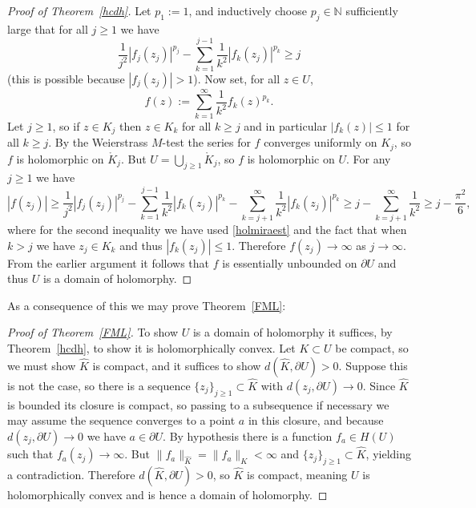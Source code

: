\documentclass[11pt,a4paper, final, twoside]{article}
\numberwithin{equation}{section}
\newcommand{\N}{\mathbb N}
\newcommand{\bd}{\partial}
\newcommand{\inter}[1]{\mathring{#1}}
\newcommand{\emetric}{d}
\newcommand{\hol}{H}
\begin{document}
\begin{proof}[Proof of Theorem~\ref{hcdh}]
Let $p_1:=1$, and inductively choose $p_j\in\N$ sufficiently large that for all $j\geq 1$ we have
\begin{equation} \frac{1}{j^2}|f_j(z_j)|^{p_j}- \sum_{k=1}^{j-1} \frac{1}{k^2}|f_k(z_j)|^{p_k}\geq j \label{holmiraest}\end{equation}
(this is possible because $|f_j(z_j)|>1$). Now set, for all $z\in U$, 
$$ f(z):=\sum_{k=1}^\infty \frac{1}{k^2}f_k(z)^{p_k}. $$
Let $j\geq 1$, so if $z\in K_j$ then $z\in K_k$ for all $k\geq j$ and in particular $|f_k(z)|\leq 1$ for all $k\geq j$. By the Weierstrass $M$-test the series for $f$ 
converges uniformly on $K_j$,
so $f$ is holomorphic on $\inter K_j$. But $U=\bigcup_{j\geq 1}\inter K_j$, so $f$ is holomorphic on $U$.
For any $j\geq 1$ we have
$$ |f(z_j)| \geq \frac{1}{j^2}|f_j(z_j)|^{p_j}-\sum_{k=1}^{j-1} \frac{1}{k^2}|f_k(z_j)|^{p_k} -\sum_{k=j+1}^\infty \frac{1}{k^2}|f_k(z_j)|^{p_k}\geq j-\sum_{k=j+1}^\infty \frac{1}{k^2}\geq j-\frac{\pi^2}{6},$$
where for the second inequality we have used \eqref{holmiraest} and the fact that when $k>j$ we have $z_j\in K_k$ and thus $|f_k(z_j)|\leq 1$. Therefore $f(z_j)\to\infty$ as $j\to\infty$. From the earlier argument it follows that $f$ is essentially unbounded on $\bd U$ and thus $U$ is a domain of holomorphy.
\end{proof}
As a consequence of this we may prove Theorem~\ref{FML}:
\begin{proof}[Proof of Theorem~\ref{FML}]
To show $U$ is a domain of holomorphy it suffices, by Theorem~\ref{hcdh}, to show it is holomorphically convex. Let $K\subset U$ be compact, so we must show $\hat K$ is compact, and it suffices to show $\emetric(\hat K,\bd U)>0$.
Suppose this is not the case, so there is a sequence $\{z_j\}_{j\geq 1}\subset \hat K$ with $\emetric(z_j,\bd U)\to 0$. Since $\hat K$ is bounded its closure is compact,
so passing to a subsequence if necessary we may assume the sequence converges to a point $a$ in this closure, and because $\emetric(z_j,\bd U)\to 0$ we have $a\in\bd U$. By hypothesis
there is a function $f_a\in\hol(U)$ such that $f_a(z_j)\to\infty$. But $\|f_a\|_{\hat K}=\|f_a\|_K<\infty$ and $\{z_j\}_{j\geq 1}\subset \hat K$, yielding a contradiction.
Therefore $\emetric(\hat K,\bd U)>0$, so $\hat K$ is compact, meaning $U$ is holomorphically convex and is hence a domain of holomorphy.
\end{proof}
\end{document}
